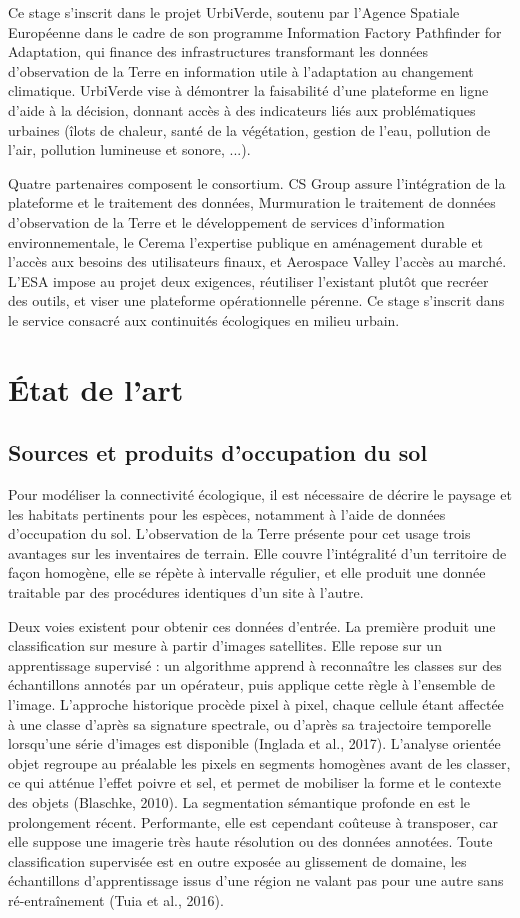 \documentclass[a4paper,12pt]{report}
\begin{document}
Ce stage s'inscrit dans le projet UrbiVerde, soutenu par l'Agence Spatiale Européenne dans le cadre de son programme Information Factory Pathfinder for Adaptation, qui finance des infrastructures transformant les données d'observation de la Terre en information utile à l'adaptation au changement climatique. UrbiVerde vise à démontrer la faisabilité d'une plateforme en ligne d'aide à la décision, donnant accès à des indicateurs liés aux problématiques urbaines (îlots de chaleur, santé de la végétation, gestion de l'eau, pollution de l'air, pollution lumineuse et sonore, ...).

Quatre partenaires composent le consortium. CS Group assure l'intégration de la plateforme et le traitement des données, Murmuration le traitement de données d'observation de la Terre et le développement de services d'information environnementale, le Cerema l'expertise publique en aménagement durable et l'accès aux besoins des utilisateurs finaux, et Aerospace Valley l'accès au marché. L'ESA impose au projet deux exigences, réutiliser l'existant plutôt que recréer des outils, et viser une plateforme opérationnelle pérenne. Ce stage s'inscrit dans le service consacré aux continuités écologiques en milieu urbain.

\section{État de l'art}
\subsection{Sources et produits d'occupation du sol}
Pour modéliser la connectivité écologique, il est nécessaire de décrire le paysage et les habitats pertinents pour les espèces, notamment à l'aide de données d'occupation du sol. L'observation de la Terre présente pour cet usage trois avantages sur les inventaires de terrain. Elle couvre l'intégralité d'un territoire de façon homogène, elle se répète à intervalle régulier, et elle produit une donnée traitable par des procédures identiques d'un site à l'autre.

Deux voies existent pour obtenir ces données d'entrée. La première produit une classification sur mesure à partir d'images satellites. Elle repose sur un apprentissage supervisé : un algorithme apprend à reconnaître les classes sur des échantillons annotés par un opérateur, puis applique cette règle à l'ensemble de l'image. L'approche historique procède pixel à pixel, chaque cellule étant affectée à une classe d'après sa signature spectrale, ou d'après sa trajectoire temporelle lorsqu'une série d'images est disponible (Inglada et al., 2017). L'analyse orientée objet regroupe au préalable les pixels en segments homogènes avant de les classer, ce qui atténue l'effet poivre et sel, et permet de mobiliser la forme et le contexte des objets (Blaschke, 2010). La segmentation sémantique profonde en est le prolongement récent. Performante, elle est cependant coûteuse à transposer, car elle suppose une imagerie très haute résolution ou des données annotées. Toute classification supervisée est en outre exposée au glissement de domaine, les échantillons d'apprentissage issus d'une région ne valant pas pour une autre sans ré-entraînement (Tuia et al., 2016).
\end{document}
